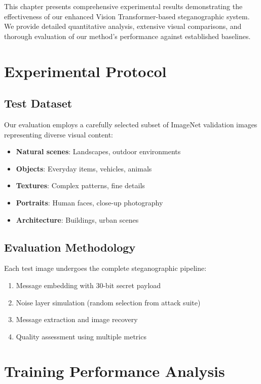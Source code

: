 \documentclass[12pt,a4paper]{report}
\begin{document}
This chapter presents comprehensive experimental results demonstrating the effectiveness of our enhanced Vision Transformer-based steganographic system. We provide detailed quantitative analysis, extensive visual comparisons, and thorough evaluation of our method's performance against established baselines.

\section{Experimental Protocol}

\subsection{Test Dataset}

Our evaluation employs a carefully selected subset of ImageNet validation images representing diverse visual content:

\begin{itemize}
    \item \textbf{Natural scenes}: Landscapes, outdoor environments
    \item \textbf{Objects}: Everyday items, vehicles, animals
    \item \textbf{Textures}: Complex patterns, fine details
    \item \textbf{Portraits}: Human faces, close-up photography
    \item \textbf{Architecture}: Buildings, urban scenes
\end{itemize}

\subsection{Evaluation Methodology}

Each test image undergoes the complete steganographic pipeline:

\begin{enumerate}
    \item Message embedding with 30-bit secret payload
    \item Noise layer simulation (random selection from attack suite)
    \item Message extraction and image recovery
    \item Quality assessment using multiple metrics
\end{enumerate}

\section{Training Performance Analysis}
\end{document}
